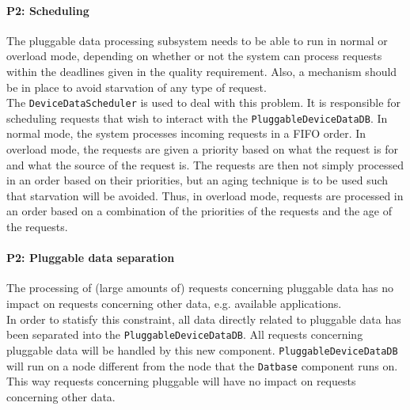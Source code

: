        \paragraph{P2: Scheduling}
            The pluggable data processing subsystem needs to be able to run in normal
            or overload mode, depending on whether or not the system can process
            requests within the deadlines given in the quality requirement. Also,
            a mechanism should be in place to avoid starvation of any type of request. \\
            The \texttt{DeviceDataScheduler} is used to deal with this problem.
            It is responsible for scheduling requests that wish to interact with
            the \texttt{PluggableDeviceDataDB}. In normal mode, the system processes
            incoming requests in a FIFO order. In overload mode, the requests are
            given a priority based on what the request is for and what the source
            of the request is. The requests are then not simply processed in an
            order based on their priorities, but an aging technique is to be used
            such that starvation will be avoided. Thus, in overload mode,
            requests are processed in an order based on a combination of the
            priorities of the requests and the age of the requests.

        \paragraph{P2: Pluggable data separation}
            The processing of (large amounts of) requests concerning pluggable
            data has no impact on requests concerning other data, e.g. available applications. \\
            In order to statisfy this constraint, all data directly related to
            pluggable data has been separated into the \texttt{PluggableDeviceDataDB}.
            All requests concerning pluggable data will be handled by this new
            component. \texttt{PluggableDeviceDataDB} will run on a node different
            from the node that the \texttt{Datbase} component runs on. This way
            requests concerning pluggable will have no impact on
            requests concerning other data.

